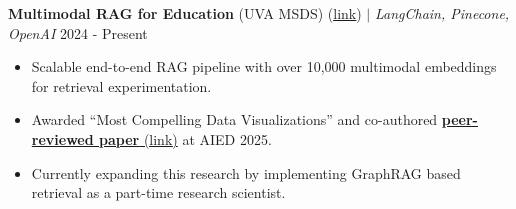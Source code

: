 \documentclass[letterpaper,11pt]{article}
\begin{document}
{\textbf{Multimodal RAG for Education} (UVA MSDS)} (\href{https://github.com/MSDS-Capstone-Project/MultiModalRAG}{\underline{link}}) $|$ \emph{LangChain, Pinecone, OpenAI} \hfill{2024 - Present}\vspace{-4pt}
\begin{itemize}[leftmargin=0.18in, itemsep=1px, parsep=0pt]
\item Scalable end-to-end RAG pipeline with over 10,000 multimodal embeddings for retrieval experimentation.
\item{Awarded “Most Compelling Data Visualizations” and co-authored \href{\paperlink}{\textbf{peer-reviewed paper} ({\underline{link}})} at AIED 2025.}
\item Currently expanding this research by implementing GraphRAG based retrieval as a part-time research scientist.
\end{itemize}\vspace{-0pt}










\end{document}
